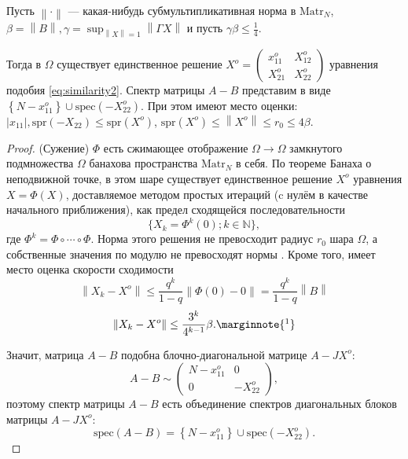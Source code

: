 \begin{lemma}
    Пусть \( {\left\|\cdot\right\|} \) --- какая-нибудь субмультипликативная норма в \( \mathrm{Matr}_{N} \),
    \( \beta={\left\|B\right\|}, \gamma=\sup_{{\left\|X\right\|}=1}{\left\|\Gamma X\right\|} \)
    и пусть
    \( \gamma\beta\leq\frac14. \)

    Тогда в \( \Omega \) существует единственное решение
    \( X^o = \begin{pmatrix}
        x_{11}^o & X_{12}^o \\
        X_{21}^o & X_{22}^o
    \end{pmatrix}\) уравнения подобия
    \eqref{eq:similarity2}.
    Спектр матрицы \( A - B \) представим в виде
    \( \left\{ N - x_{11}^o \right\} \cup \mathrm{spec}\left({-X_{22}^o}\right) \).
    При этом имеют место оценки:
    \( \lvert x_{11} \rvert, \mathrm{spr}\left({-X_{22}}\right) \leq \mathrm{spr}\left({X^o}\right) \),
    \(
        \mathrm{spr}\left({X^o}\right) \leq {\left\|X^o\right\|} \leq r_0 \leq 4\beta.
        \)
\end{lemma}
\begin{proof}
    (Сужение) \( \Phi \) есть сжимающее отображение \( \Omega\to\Omega \)
    замкнутого подмножества \( \Omega \)
    банахова пространства \( \mathrm{Matr}_{N} \) в себя.
    По теореме Банаха о неподвижной точке, в этом шаре существует единственное решение \( X^o \)
    уравнения \( X = \Phi (X) \),
    доставляемое методом простых итераций (c нулём в качестве начального приближения),
    как предел сходящейся последовательности
    \[
        \{X_k = \Phi^k(0); k\in\mathbb{N}\},
        \]
    где \( \Phi^k = \Phi \circ \cdots \circ \Phi \).
    Норма этого решения не превосходит радиус \( r_0 \) шара \( \Omega \),
    а собственные значения по модулю не превосходят нормы \cite{baskakov-harmonic}.
    Кроме того, имеет место оценка скорости сходимости
    \[
        {\left\|X_k - X^o\right\|} \leq \frac{q^k}{1-q} {\left\|\Phi(0) - 0\right\|} = \frac{q^k}{1-q}{\left\|B\right\|}
        \]
    \[
        {\left\|X_k - X^o\right\|} \leq \frac{3^k}{4^{k-1}}\beta. \marginnote{\footnotemark}
        \]

    Значит, матрица \( A-B \) подобна блочно-диагональной матрице \( A - JX^o \):
    \[
        A-B \sim
    \begin{pmatrix}
        N - x_{11}^o & 0 \\
        0            & -X_{22}^o
    \end{pmatrix},
    \]
    поэтому спектр матрицы \( A - B \) есть объединение спектров
    диагональных блоков матрицы \( A - JX^o \):
    \[ \mathrm{spec}\left({A-B}\right) = \left\{N - x_{11}^o\right\} \cup \mathrm{spec}\left({-X_{22}^o}\right). \]
\end{proof}
